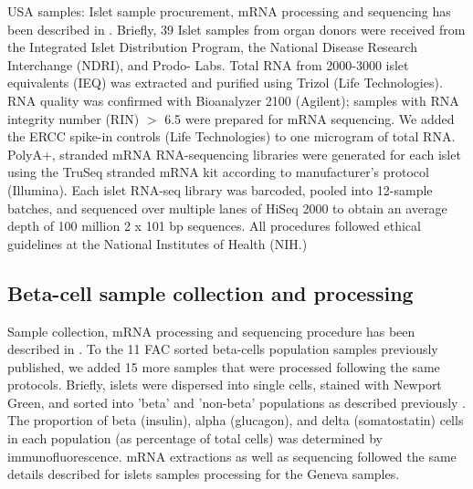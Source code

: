 USA samples: Islet sample procurement, mRNA processing and sequencing has been described in \cite{varshneyGeneticRegulatorySignatures2017}. Briefly, 39 Islet samples from organ donors were received from the Integrated Islet Distribution Program, the National Disease Research Interchange (NDRI), and Prodo- Labs. Total RNA from 2000-3000 islet equivalents (IEQ) was extracted and purified using Trizol (Life Technologies). RNA quality was confirmed with Bioanalyzer 2100 (Agilent); samples with RNA integrity number (RIN) $>$ 6.5 were prepared for mRNA sequencing. We added the \ac{ERCC} spike-in controls (Life Technologies) to one microgram of total RNA. PolyA+, stranded mRNA RNA-sequencing libraries were generated for each islet using the TruSeq stranded mRNA kit according to manufacturer's protocol (Illumina). Each islet RNA-seq library was barcoded, pooled into 12-sample batches, and sequenced over multiple lanes of HiSeq 2000 to obtain an average depth of 100 million 2 x 101 bp sequences. All procedures followed ethical guidelines at the National Institutes of Health (NIH.)

\subsection{Beta-cell sample collection and processing}
Sample collection, mRNA processing and sequencing procedure has been described in \cite{nicaCelltypeAllelicGenetic2013}. To the 11 FAC sorted beta-cells population samples previously published, we added 15 more samples that were processed following the same protocols. Briefly, islets were dispersed into single cells, stained with Newport Green, and sorted into 'beta' and 'non-beta' populations as described previously \cite{parnaudProliferationSortedHuman2008}. The proportion of beta (insulin), alpha (glucagon), and delta (somatostatin) cells in each population (as percentage of total cells) was determined by immunofluorescence. mRNA extractions as well as sequencing followed the same details described for islets samples processing for the Geneva samples.

